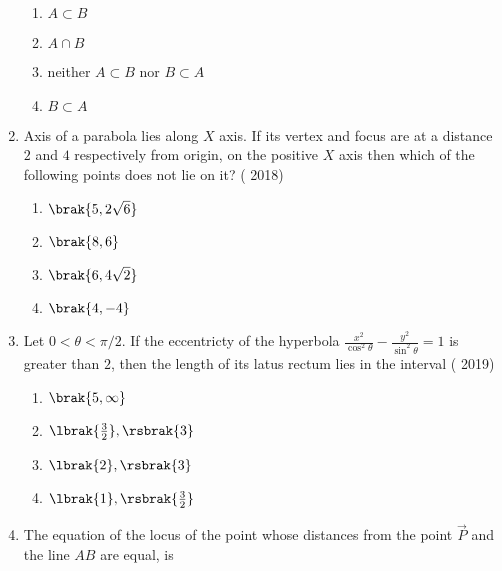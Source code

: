 \begin{enumerate}[label=\thesubsection.\arabic*.,ref=\thesubsection.\theenumi]
\begin{multicols}{2}
\begin{enumerate}
		\item $A\subset B$ 
		\item $A\cap B$
		\item neither $A\subset B$ nor $B\subset A$
		\item $B\subset A$
	\end{enumerate}\end{multicols}
\item Axis of a parabola lies along $X$ axis. If its vertex and focus are at a distance $2$ and $4$ respectively from origin, on the positive $X$ axis then which of the following points does not lie on it? 
     \hfill{( 2018)} 
				\begin{multicols}{4}
	\begin{enumerate}
    		\item $\brak{5,2\sqrt6}$
    		\item $\brak{8,6}$
    		\item $\brak{6,4\sqrt2}$
    		\item $\brak{4,-4}$
	\end{enumerate}\end{multicols}
\item Let $0<\theta<\pi/2$. If the eccentricty of the hyperbola $\frac{x^2}{\cos^2{\theta}} - \frac{y^2}{\sin^2{\theta}} = 1$ is greater than $2$, then the length of its latus rectum lies in the interval
	\hfill{( 2019)}
					\begin{multicols}{4}
	\begin{enumerate}
    		\item $\brak{5,\infty}$
    		\item $\lbrak{\frac{3}{2}},\rsbrak{3}$
    		\item $\lbrak{2},\rsbrak{3}$ 
    		\item $\lbrak{1},\rsbrak{\frac{3}{2}}$
	\end{enumerate} \end{multicols}
\item  The equation of the locus of the point whose distances from the point $\Vec{P}$ and the line $AB$ are equal, is


\end{enumerate}
